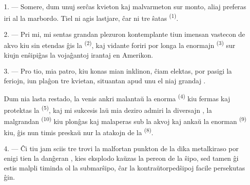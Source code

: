 %

\VUsaut{4.0mm}
\VUsaut{3.0mm}
\VUsaut{3.0mm}

1. --- Somere, dum unuj serĉas kvieton kaj malvarmeton sur monto, aliaj
preferas iri al la marbordo. Tiel ni agis lastjare, ĉar ni tre ŝatas
 \textsuperscript{(1)}.

2. --- Pri mi, mi sentas grandan plezuron kontemplante tiun imensan vastecon
de akvo kiu sin etendas ĝis la  \textsuperscript{(2)}, kaj
vidante foriri por longa  la enormajn 
\textsuperscript{(3)} sur kiujn enŝipiĝas la vojaĝantoj irantaj en Amerikon.

3. --- Pro tio, mia patro, kiu konas mian inklinon, ĉiam elektas, por pasigi la
feriojn, iun plaĝon tre kvietan, situantan apud unu el niaj grandaj
.

Dum nia lasta restado, la  venis ankri malantaŭ la enorma
 \textsuperscript{(4)} kiu fermas kaj protektas la  \textsuperscript{(5)}, kaj mi sukcesis laŭ mia deziro admiri la
diversajn , la malgrandan 
\textsuperscript{(10)} kiu plonĝas kaj malaperas sub la akvoj kaj ankaŭ la
enorman  \textsuperscript{(9)} kiu, ĝis nun timis preskaŭ nur
la atakojn de la  \textsuperscript{(8)}.

\VUsaut{3.0mm}
\VUsaut{3.0mm}

4. --- Ĉi tiu jam sciis tre  trovi la malfortan punkton de la dika
metalkiraso por enigi tien la danĝeran , kies eksplodo kaŭzas
la pereon de la ŝipo, sed tamen ĝi estis malpli timinda ol la submarŝipo, ĉar
la kontraŭtorpedŝipoj facile persekutas ĝin.

